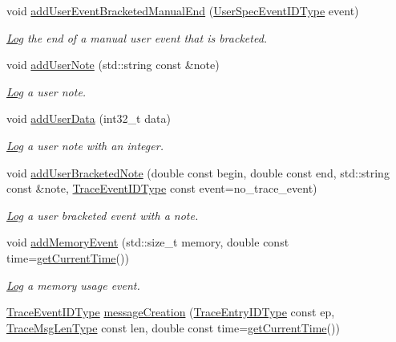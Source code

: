 \begin{DoxyCompactItemize}
void \hyperlink{structvt_1_1trace_1_1_trace_a5de97038ac60bfcdf868c3f32637ef9e}{add\+User\+Event\+Bracketed\+Manual\+End} (\hyperlink{namespacevt_1_1trace_a70c43e0e1596eea236912d4197d3120a}{User\+Spec\+Event\+I\+D\+Type} event)
\begin{DoxyCompactList}\small\item\em \hyperlink{structvt_1_1trace_1_1_log}{Log} the end of a manual user event that is bracketed. \end{DoxyCompactList}\item 
void \hyperlink{structvt_1_1trace_1_1_trace_a8be5309a84a6d0f99df0eb835fedf3b1}{add\+User\+Note} (std\+::string const \&note)
\begin{DoxyCompactList}\small\item\em \hyperlink{structvt_1_1trace_1_1_log}{Log} a user note. \end{DoxyCompactList}\item 
void \hyperlink{structvt_1_1trace_1_1_trace_a7f5ede52aa552c2eac88b894853a2efe}{add\+User\+Data} (int32\+\_\+t data)
\begin{DoxyCompactList}\small\item\em \hyperlink{structvt_1_1trace_1_1_log}{Log} a user note with an integer. \end{DoxyCompactList}\item 
void \hyperlink{structvt_1_1trace_1_1_trace_acb4416918d08379892bcf9ec85621309}{add\+User\+Bracketed\+Note} (double const begin, double const end, std\+::string const \&note, \hyperlink{namespacevt_1_1trace_a64a7185f3e102df8d8258f263ccd1582}{Trace\+Event\+I\+D\+Type} const event=no\+\_\+trace\+\_\+event)
\begin{DoxyCompactList}\small\item\em \hyperlink{structvt_1_1trace_1_1_log}{Log} a user bracketed event with a note. \end{DoxyCompactList}\item 
void \hyperlink{structvt_1_1trace_1_1_trace_abc497f6fa641ac1c2c20889815b06dbc}{add\+Memory\+Event} (std\+::size\+\_\+t memory, double const time=\hyperlink{structvt_1_1trace_1_1_trace_a04cf6b76b4ced1bc90d246a34c948db5}{get\+Current\+Time}())
\begin{DoxyCompactList}\small\item\em \hyperlink{structvt_1_1trace_1_1_log}{Log} a memory usage event. \end{DoxyCompactList}\item 
\hyperlink{namespacevt_1_1trace_a64a7185f3e102df8d8258f263ccd1582}{Trace\+Event\+I\+D\+Type} \hyperlink{structvt_1_1trace_1_1_trace_a5b5091197568d7ed104bb40d68b4ddd7}{message\+Creation} (\hyperlink{namespacevt_1_1trace_a3c14050715ba9eceaeff51fb3de64f2f}{Trace\+Entry\+I\+D\+Type} const ep, \hyperlink{namespacevt_1_1trace_aeb598f45d67d41db7902e494f2f0ce59}{Trace\+Msg\+Len\+Type} const len, double const time=\hyperlink{structvt_1_1trace_1_1_trace_a04cf6b76b4ced1bc90d246a34c948db5}{get\+Current\+Time}())

\end{DoxyCompactItemize}
